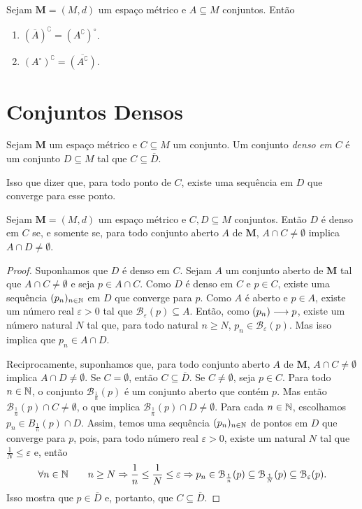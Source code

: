 \begin{prop}
	Sejam $\bm M = (M,d)$ um espaço métrico e $A \subseteq M$ conjuntos. Então
	\begin{enumerate}
	\item $(\overline A)^\complement = (A^\complement)^\circ$.
	\item $(A^\circ)^\complement = \overline{(A^\complement)}$.
	\end{enumerate}
\end{prop}

\section{Conjuntos Densos}

\begin{defi}
	Sejam $\bm M$ um espaço métrico e $C \subseteq M$ um conjunto. Um conjunto \emph{denso em $C$} é um conjunto $D \subseteq M$ tal que $C \subseteq \overline D$.
\end{defi}

	Isso que dizer que, para todo ponto de $C$, existe uma sequência em $D$ que converge para esse ponto.
	
\begin{prop}
	Sejam $\bm M = (M,d)$ um espaço métrico e $C,D \subseteq M$ conjuntos. Então $D$ é denso em $C$ se, e somente se, para todo conjunto aberto $A$ de $\bm M$, $A \cap C \neq \emptyset$ implica $A \cap D \neq \emptyset$.
\end{prop}
\begin{proof}
	Suponhamos que $D$ é denso em $C$. Sejam $A$ um conjunto aberto de $\bm M$ tal que $A \cap C \neq \emptyset$ e seja $p \in A \cap C$. Como $D$ é denso em $C$ e $p \in C$, existe uma sequência $(p_n)_{n \in \mathbb{N}}$ em $D$ que converge para $p$. Como $A$ é aberto e $p \in A$, existe um número real $\varepsilon>0$ tal que $\mathcal B_\varepsilon(p) \subseteq A$. Então, como $(p_n) \longrightarrow p$, existe um número natural $N$ tal que, para todo natural $n \geq N$, $p_n \in \mathcal B_\varepsilon(p)$. Mas isso implica que $p_n \in A \cap D$.
	
	Reciprocamente, suponhamos que, para todo conjunto aberto $A$ de $\bm M$, $A \cap C \neq \emptyset$ implica $A \cap D \neq \emptyset$. Se $C=\emptyset$, então $C \subseteq \overline D$. Se $C \neq \emptyset$, seja $p \in C$. Para todo $n \in \mathbb{N}$, o conjunto $\mathcal B_\frac{1}{n}(p)$ é um conjunto aberto que contém $p$. Mas então $\mathcal B_\frac{1}{n}(p) \cap C \neq \emptyset$, o que implica $\mathcal B_\frac{1}{n}(p) \cap D \neq \emptyset$. Para cada $n \in \mathbb{N}$, escolhamos $p_n \in B_\frac{1}{n}(p) \cap D$. Assim, temos uma sequência $(p_n)_{n \in \mathbb{N}}$ de pontos em $D$ que converge para $p$, pois, para todo número real $\varepsilon>0$, existe um natural $N$ tal que $\frac{1}{N} \leq \varepsilon$ e, então
	\begin{equation*}
	\forall n \in \mathbb{N} \qquad n \geq N \Rightarrow \frac{1}{n} \leq \frac{1}{N} \leq \varepsilon \Rightarrow p_n \in \mathcal B_\frac{1}{n}(p) \subseteq \mathcal B_\frac{1}{N}(p) \subseteq \mathcal B_\varepsilon(p).
	\end{equation*}
	Isso mostra que $p \in \overline D$ e, portanto, que $C \subseteq \overline D$.
\end{proof}

